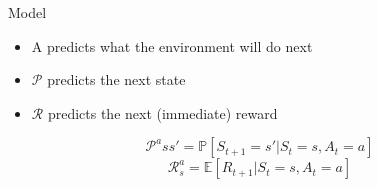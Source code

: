 \bgroup
\begin{frame}{Model}
\begin{itemize}
\item A  predicts what the environment will do next
\item $\mathcal{P}$ predicts the next state
\item $\mathcal{R}$ predicts the next (immediate) reward
\end{itemize}
\begin{equation*}
\mathcal{P}^a{ss'}=\mathbb{P}[S_{t+1}=s'| S_t=s, A_t=a]
\end{equation*}
\begin{equation*}
\mathcal{R}^a_s = \mathbb{E}[R_{t+1}|S_t=s, A_t=a]
\end{equation*}
\end{frame}
\egroup